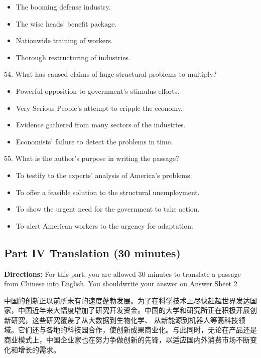 \documentclass[UTF8,11pt]{ctexart}
\begin{document}
\begin{itemize}[leftmargin=2em,itemsep=.2em,topsep=.4em]\item[A.] The booming defense industry.
\item[B.] The wise heads’ benefit package.
\item[C.] Nationwide training of workers.
\item[D.] Thorough restructuring of industries.
\end{itemize}

54. What has caused claims of huge structural problems to multiply?


\begin{itemize}[leftmargin=2em,itemsep=.2em,topsep=.4em]\item[A.] Powerful opposition to government’s stimulus efforts.
\item[B.] Very Serious People’s attempt to cripple the economy.
\item[C.] Evidence gathered from many sectors of the industries.
\item[D.] Economists’ failure to detect the problems in time.
\end{itemize}

55. What is the author’s purpose in writing the passage?


\begin{itemize}[leftmargin=2em,itemsep=.2em,topsep=.4em]\item[A.] To testify to the experts’ analysis of America’s problems.
\item[B.] To offer a feasible solution to the structural unemployment.
\item[C.] To show the urgent need for the government to take action.
\item[D.] To alert American workers to the urgency for adaptation.
\end{itemize}

\subsection*{\textbf{Part IV Translation (30 minutes)}}


\textbf{Directions:} For this part, you are allowed 30 minutes to translate a passage from Chinese into English. You shouldwrite your answer on Answer Sheet 2.


中国的创新正以前所未有的速度蓬勃发展。为了在科学技术上尽快赶超世界发达国家，中国近年来大幅度增加了研究开发资金。中国的大学和研究所正在积极开展创新研究，这些研究覆盖了从大数据到生物化学、 从新能源到机器人等高科技领域。它们还与各地的科技园合作，使创新成果商业化。与此同时，无论在产品还是商业模式上，中国企业家也在努力争做创新的先锋，以适应国内外消费市场不断变化和增长的需求。
\end{document}
